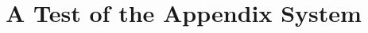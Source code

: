 \documentclass{erauthesis}
\begin{document}
% 


\backmatter

\chapter{A Test of the Appendix System}


\end{document}
